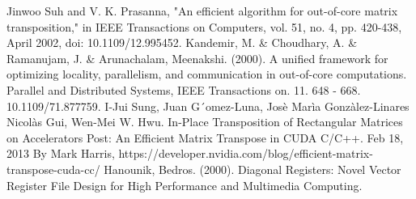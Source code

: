\documentclass[conference]{IEEEtran}
\begin{document}
\begin{thebibliography}{00}
 Jinwoo Suh and V. K. Prasanna, "An efficient algorithm for out-of-core matrix transposition," in IEEE Transactions on Computers, vol. 51, no. 4, pp. 420-438, April 2002, doi: 10.1109/12.995452.
 Kandemir, M. \& Choudhary, A. \& Ramanujam, J. \& Arunachalam, Meenakshi. (2000). A unified framework for optimizing locality, parallelism, and communication in out-of-core computations. Parallel and Distributed Systems, IEEE Transactions on. 11. 648 - 668. 10.1109/71.877759. 
 I-Jui Sung, Juan G´omez-Luna, Josè Marìa Gonzàlez-Linares
Nicolàs Gui, Wen-Mei W. Hwu. In-Place Transposition of Rectangular Matrices on Accelerators
 Post: An Efficient Matrix Transpose in CUDA C/C++. Feb 18, 2013 By Mark Harris, https://developer.nvidia.com/blog/efficient-matrix-transpose-cuda-cc/
 Hanounik, Bedros. (2000). Diagonal Registers: Novel Vector Register File Design for High Performance and Multimedia Computing. 
\end{thebibliography}
\vspace{12pt}
\end{document}
